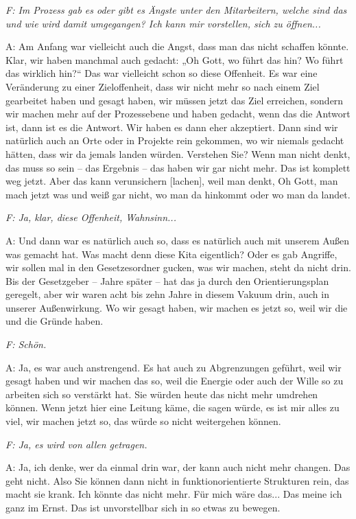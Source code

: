 \begin{linenumbers*}
\emph{F: Im Prozess gab es oder gibt es Ängste unter den Mitarbeitern, welche sind das und wie wird damit umgegangen? Ich kann mir vorstellen, sich zu öffnen...}

A: Am Anfang war vielleicht auch die Angst, dass man das nicht schaffen könnte. Klar, wir haben manchmal auch gedacht: „Oh Gott, wo führt das hin? Wo führt das wirklich hin?“ Das war vielleicht schon so diese Offenheit. Es war eine Veränderung zu einer Zieloffenheit, dass wir nicht mehr so nach einem Ziel gearbeitet haben und gesagt haben, wir müssen jetzt das Ziel erreichen, sondern wir machen mehr auf der Prozessebene und haben gedacht, wenn das die Antwort ist, dann ist es die Antwort. Wir haben es dann eher akzeptiert. Dann sind wir natürlich auch an Orte oder in Projekte rein gekommen, wo wir niemals gedacht hätten, dass wir da jemals landen würden. Verstehen Sie? Wenn man nicht denkt, das muss so sein -- das Ergebnis -- das haben wir gar nicht mehr. Das ist komplett weg jetzt. Aber das kann verunsichern [lachen], weil man denkt, Oh Gott, man mach jetzt was und weiß gar nicht, wo man da hinkommt oder wo man da landet. 

\emph{F: Ja, klar, diese Offenheit, Wahnsinn...}

A: Und dann war es natürlich auch so, dass es natürlich auch mit unserem Außen was gemacht hat. Was macht denn diese Kita eigentlich? Oder es gab Angriffe, wir sollen mal in den Gesetzesordner gucken, was wir machen, steht da nicht drin. Bis der Gesetzgeber -- Jahre später -- hat das ja durch den Orientierungsplan geregelt, aber wir waren acht bis zehn Jahre in diesem Vakuum drin, auch in unserer Außenwirkung. Wo wir gesagt haben, wir machen es jetzt so, weil wir die und die Gründe haben.

\emph{F: Schön.}

A: Ja, es war auch anstrengend. Es hat auch zu Abgrenzungen geführt, weil wir gesagt haben und wir machen das so, weil die Energie oder auch der Wille so zu arbeiten sich so verstärkt hat. Sie würden heute das nicht mehr umdrehen können. Wenn jetzt hier eine Leitung käme, die sagen würde, es ist mir alles zu viel, wir machen jetzt so, das würde so nicht weitergehen können.

\emph{F: Ja, es wird von allen getragen.}

A: Ja, ich denke, wer da einmal drin war, der kann auch nicht mehr changen. Das geht nicht. Also Sie können dann nicht in funktionorientierte Strukturen rein, das macht sie krank. Ich könnte das nicht mehr. Für mich wäre das... Das meine ich ganz im Ernst. Das ist unvorstellbar sich in so etwas zu bewegen. 


\end{linenumbers*}
